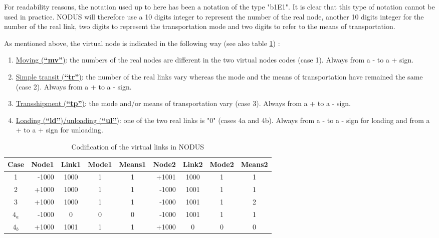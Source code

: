 For readability reasons, the notation used up to here has been a
notation of the type "b1E1".  It is clear that this type of notation cannot be
used in practice.  NODUS will therefore use a 10 digits integer to represent
the number of the real node, another 10 digits integer for the number of the
real link,  two digits to represent the transportation mode and two digits to
refer to the means of transportation.

As mentioned above, the virtual node is indicated in the following way (see also
table \ref{tab3_8}) :


\begin{enumerate}
\item \underline{Moving (\textbf{``mv''})}: the numbers of the real nodes are different in the two virtual nodes codes (case 1). Always from a - to a + sign.
\item \underline{Simple transit (\textbf{``tr''})}: the number of the real links vary whereas the mode and
the means of transportation have remained the same (case 2). Always from a + to a - sign.
\item \underline{Transshipment (\textbf{``tp''})}: the mode and/or means of transportation vary (case 3). Always from a + to a - sign.
\item \underline{Loading (\textbf{``ld''})/unloading (\textbf{``ul''})}: one of the two real links is "0"
(cases 4a and 4b). Always from a - to a - sign for loading and from a + to a + sign for unloading.
\end{enumerate}



\begin{table}[htbp]
\begin{center}
\begin{tabular}{crcccrccc}
\hline

Case & Node1 & Link1 & Mode1 & Means1 & Node2 & Link2 & Mode2 & Means2\\
\hline
1 & -1000 & 1000 & 1 & 1 & +1001 & 1000 & 1 & 1\\

2 & +1000 & 1000 & 1 & 1 & -1000 & 1001 & 1 & 1\\

3 & +1000 & 1000 & 1 & 1 & -1000 & 1001 & 1 & 2\\

$4_a$ & -1000 & 0 & 0 & 0 & -1000 & 1001 & 1 & 1\\

$4_b$ & +1000 & 1001 & 1 & 1 & +1000 & 0 & 0 & 0\\
\hline
\end{tabular}
\caption{\label{tab3_8} Codification of the virtual links in NODUS}
\end{center}
\end{table}


